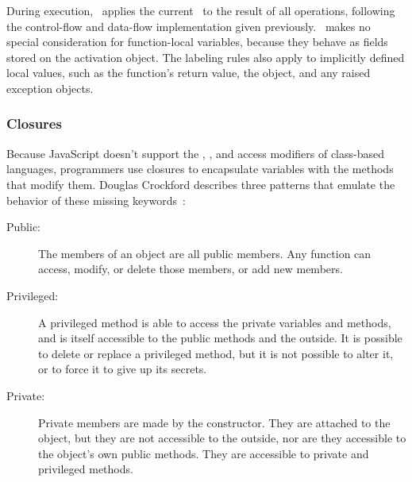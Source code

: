 During execution, \FlowCore\ applies the current \pclabel\ to the result of all operations, following the control-flow and data-flow implementation given previously.
\FlowCore\ makes no special consideration for function-local variables, because they behave as fields stored on the activation object.
The labeling rules also apply to implicitly defined local values, such as the function's return value, the  object, and any raised exception objects.

\begin{comment}
function foo() {
  console.log(arguments.caller)        // undefined
  console.log(arguments.length)        // length of the argumets
  console.log(Function.caller)         // null
  console.log(foo.caller)              // code of parent function
  console.log(arguments.callee.caller) // code of parent function
  console.log(arguments.callee)        // code of self
  console.log(typeof arguments)        // object
}

foo(1,2,3,4)
\end{comment}

\subsubsection{Closures}


Because JavaScript doesn't support the , , and  access modifiers of class-based languages, programmers use closures to encapsulate variables with the methods that modify them.
Douglas Crockford describes three patterns that emulate the behavior of these missing keywords~\cite{crockford+01}:

\begin{description}
  \item[Public:]
    The members of an object are all public members. Any function can access, modify, or delete those members, or add new members.
  \item[Privileged:]
    A privileged method is able to access the private variables and methods, and is itself accessible to the public methods and the outside.
    It is possible to delete or replace a privileged method, but it is not possible to alter it, or to force it to give up its secrets.
  \item[Private:]
    Private members are made by the constructor.
    They are attached to the object, but they are not accessible to the outside, nor are they accessible to the object's own public methods.
    They are accessible to private and privileged methods.
\end{description}

